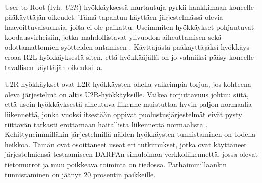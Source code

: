 User-to-Root (lyh. \textit{U2R}) hyökkäyksessä murtautuja pyrkii hankkimaan
koneelle pääkäyttäjän oikeudet. Tämä tapahtuu käyttäen järjestelmässä
olevia haavoittuvaisuuksia, joita ei ole paikattu. Useimmiten
hyökkäykset pohjautuvat koodausvirheisiin, jotka mahdollistavat
ylivuodon aiheuttamisen sekä odottamattomien syötteiden antamisen
\cite{IDS}. Käyttäjästä pääkäyttäjäksi hyökkäys eroaa R2L hyökkäyksestä
siten, että hyökkääjällä on jo valmiiksi pääsy koneelle tavallisen
käyttäjän oikeuksilla.

U2R-hyökkäykset ovat L2R-hyökkäysten ohella vaikeimpia torjua, jos kohteena
oleva järjestelmä on altis U2R-hyökkäyksille. Vaikea torjuttavuus johtuu siitä, että
usein hyökkäyksestä aiheutuva liikenne muistuttaa hyvin paljon normaalia
liikennettä, jonka vuoksi itsestään oppivat puolustusjärjestelmät eivät pysty
riittävän tarkasti erottamaan haitallista liikennettä normaalista \cite{U2R}.
Kehittyneimmilläkin järjestelmillä näiden hyökkäysten tunnistaminen on todella
heikkoa. Tämän ovat osoittaneet useat eri tutkimukset, jotka ovat käyttäneet
järjestelmiensä testaamiseen DARPAn simuloimaa verkkoliikennettä,
jossa olevat tietomurrot ja muu poikkeava toiminta on tiedossa.
Parhaimmillaankin tunnistaminen on jäänyt 20 prosentin
paikkeille.
